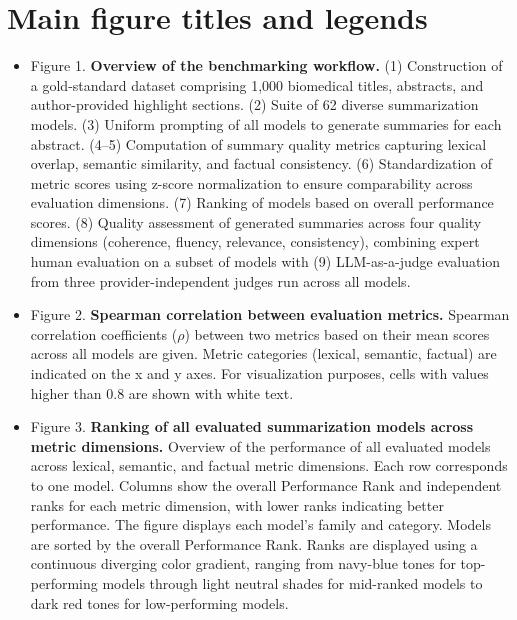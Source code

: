 \section{Main figure titles and legends}

\label{fig:workflow_graphic}
\label{fig:metric_correlation}
\label{fig:rank_heatmap}
\label{fig:category_boxplots_and_gameshowell}
\label{fig:family_boxplots_and_gameshowell}
\label{fig:assessment_results}

\begin{itemize}
	\item Figure 1. \textbf{Overview of the benchmarking workflow.} (1) Construction of a gold-standard dataset comprising 1,000 biomedical titles, abstracts, and author-provided highlight sections. (2) Suite of 62 diverse summarization models. (3) Uniform prompting of all models to generate summaries for each abstract. (4--5) Computation of summary quality metrics capturing lexical overlap, semantic similarity, and factual consistency. (6) Standardization of metric scores using z-score normalization to ensure comparability across evaluation dimensions. (7) Ranking of models based on overall performance scores. (8) Quality assessment of generated summaries across four quality dimensions (coherence, fluency, relevance, consistency), combining expert human evaluation on a subset of models with (9) \ac{LLM}-as-a-judge evaluation from three provider-independent judges run across all models.
	\item Figure 2. \textbf{Spearman correlation between evaluation metrics.} Spearman correlation coefficients ($\rho$) between two metrics based on their mean scores across all models are given. Metric categories (lexical, semantic, factual) are indicated on the x and y axes. For visualization purposes, cells with values higher than 0.8 are shown with white text.
	\item Figure 3. \textbf{Ranking of all evaluated summarization models across metric dimensions.} Overview of the performance of all evaluated models across lexical, semantic, and factual metric dimensions. Each row corresponds to one model. Columns show the overall Performance Rank and independent ranks for each metric dimension, with lower ranks indicating better performance. The figure displays each model’s family and category. Models are sorted by the overall Performance Rank. Ranks are displayed using a continuous diverging color gradient, ranging from navy-blue tones for top-performing models through light neutral shades for mid-ranked models to dark red tones for low-performing models. 

\end{itemize}
